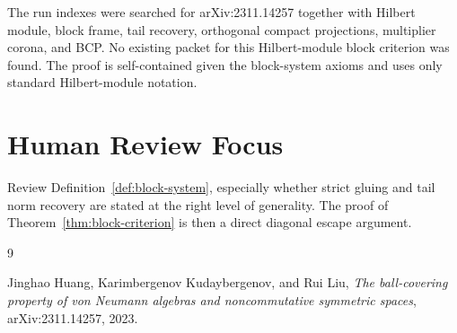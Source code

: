\documentclass[11pt]{article}
\begin{document}
The run indexes were searched for arXiv:2311.14257 together with Hilbert
module, block frame, tail recovery, orthogonal compact projections, multiplier
corona, and BCP.  No existing packet for this Hilbert-module block criterion
was found.  The proof is self-contained given the block-system axioms and uses
only standard Hilbert-module notation.

\section*{Human Review Focus}

Review Definition~\ref{def:block-system}, especially whether strict gluing and
tail norm recovery are stated at the right level of generality.  The proof of
Theorem~\ref{thm:block-criterion} is then a direct diagonal escape argument.

\begin{thebibliography}{9}

Jinghao Huang, Karimbergenov Kudaybergenov, and Rui Liu,
\emph{The ball-covering property of von Neumann algebras and noncommutative
symmetric spaces},
arXiv:2311.14257, 2023.

\end{thebibliography}
\end{document}
